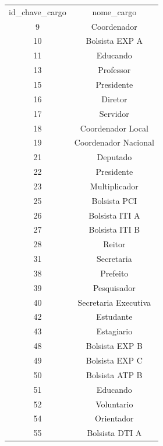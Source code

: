 \documentclass[
12pt,		%
openright,	%
twoside,  %
a4paper,			%
chapter=TITLE,		%
english,			%
french,				%
spanish,			%
brazil				%
]{USPSC-classe/USPSC}
\begin{document}
\begin{table}[htb]
\centering
\begin{tabular}{|c|c|}
\hline
id\_chave\_cargo  &  nome\_cargo            \\
             9  &  Coordenador           \\
            10  &  Bolsista EXP A        \\
            11  &  Educando              \\
            13  &  Professor             \\
            15  &  Presidente            \\
            16  &  Diretor               \\
            17  &  Servidor              \\
            18  &  Coordenador Local     \\
            19  &  Coordenador Nacional  \\
            21  &  Deputado              \\
            22  &  Presidente            \\
            23  &  Multiplicador         \\
            25  &  Bolsista PCI   \\
            26  &  Bolsista ITI A \\
            27  &  Bolsista ITI B \\
            28  &  Reitor \\
            31  &  Secretaria \\
            38  &  Prefeito              \\
            39  &  Pesquisador           \\
            40  &  Secretaria Executiva             \\
            42  &  Estudante    \\
            43  &  Estagiario \\
            48  &  Bolsista EXP B \\
            49  &  Bolsista EXP C \\
            50  &  Bolsista ATP B \\
            51  &  Educando \\
            52  &  Voluntario \\
            54  &  Orientador            \\
            55  &  Bolsista DTI A \\
\hline
\end{tabular}
\end{table}
\end{document}

